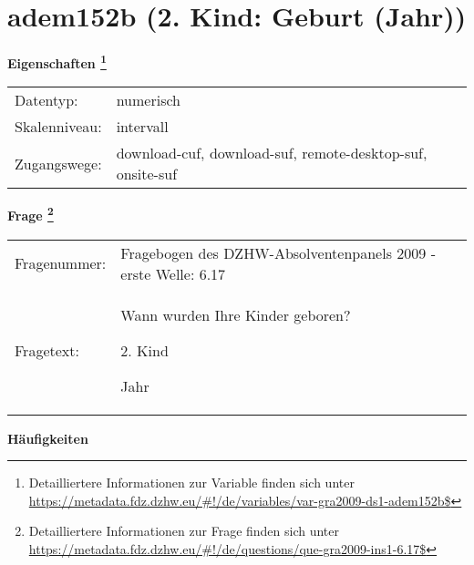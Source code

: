 
    \setcounter{footnote}{0}

    \vspace*{-1.8cm}
	\section{adem152b (2. Kind: Geburt (Jahr))}
	\label{section:adem152b}



    \vspace*{0.5cm}
    \noindent\textbf{Eigenschaften
	\footnote{Detailliertere Informationen zur Variable finden sich unter
		\url{https://metadata.fdz.dzhw.eu/\#!/de/variables/var-gra2009-ds1-adem152b$}}}\\
	\begin{tabularx}{\hsize}{@{}lX}
	Datentyp: & numerisch \\
	Skalenniveau: & intervall \\
	Zugangswege: &
	  download-cuf, 
	  download-suf, 
	  remote-desktop-suf, 
	  onsite-suf
 \\
    \end{tabularx}



				\vspace*{0.5cm}
                \noindent\textbf{Frage
	                \footnote{Detailliertere Informationen zur Frage finden sich unter
		              \url{https://metadata.fdz.dzhw.eu/\#!/de/questions/que-gra2009-ins1-6.17$}}}\\
				\begin{tabularx}{\hsize}{@{}lX}
					Fragenummer: &
					  Fragebogen des DZHW-Absolventenpanels 2009 - erste Welle:
					  6.17
 \\
					Fragetext: & Wann wurden Ihre Kinder geboren?\par  2. Kind\par  Jahr \\
				\end{tabularx}





        		\vspace*{0.5cm}
                \noindent\textbf{Häufigkeiten}


